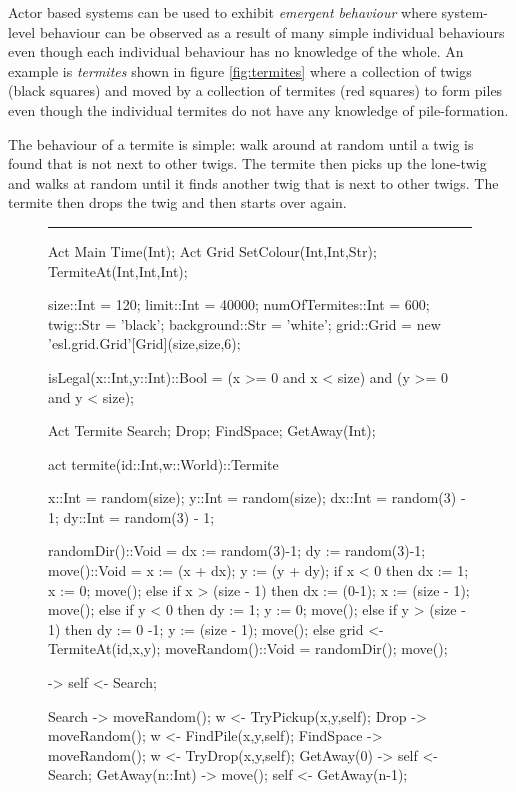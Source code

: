\documentclass[5p,times]{elsarticle}
\begin{document}
Actor based systems can be used to exhibit {\it emergent behaviour} where system-level behaviour can be observed as a result of many simple individual behaviours even though each individual behaviour has no knowledge of the whole. An example is {\it termites} shown in figure \ref{fig:termites} where a collection of twigs (black squares) and moved by a collection of termites (red squares) to form piles even though the individual termites do not have any knowledge of pile-formation.

The behaviour of a termite is simple: walk around at random until a twig is found that is not next to other twigs. The termite then picks up the lone-twig and walks at random until it finds another twig that is next to other twigs. The termite then drops the twig and then starts over again.


\begin{figure}
\hrule\textwidth1cm
\begin{multicols}{2}
\begin{FigESL}
Act Main { Time(Int); }
Act Grid { SetColour(Int,Int,Str); TermiteAt(Int,Int,Int);}

size::Int          = 120;
limit::Int         = 40000;
numOfTermites::Int = 600;
twig::Str          = 'black';
background::Str    = 'white';
grid::Grid         = new 'esl.grid.Grid'[Grid](size,size,6); 

isLegal(x::Int,y::Int)::Bool = 
  (x >= 0 and x < size) and (y >= 0 and y < size);

Act Termite {  Search; Drop; FindSpace; GetAway(Int); }

act termite(id::Int,w::World)::Termite { 

  x::Int  = random(size);
  y::Int  = random(size);
  dx::Int = random(3) - 1;
  dy::Int = random(3) - 1;
  
  randomDir()::Void = {
    dx := random(3)-1;
    dy := random(3)-1;
  }
  move()::Void = {
    x := (x + dx); y := (y + dy);
    if x < 0 
    then { dx := 1; x := 0; move();
    } else if x > (size - 1)
    then { dx := (0-1); x := (size - 1); move();
    } else if y < 0 
    then { dy := 1; y := 0; move();
    } else if y > (size - 1)
    then { dy := 0 -1; y := (size - 1); move();
    } else grid <- TermiteAt(id,x,y);
  }
  moveRandom()::Void = {
    randomDir();
    move();
  }
  
  -> self <- Search;
  
  Search -> {
    moveRandom();
    w <- TryPickup(x,y,self);
  }
  Drop -> {
    moveRandom();
    w <- FindPile(x,y,self);
  }
  FindSpace -> {
    moveRandom();
    w <- TryDrop(x,y,self);
  }
  GetAway(0) -> {
    self <- Search;
  }
  GetAway(n::Int) -> {
    move();
    self <- GetAway(n-1);
  }
}



\end{FigESL}
\end{multicols}
\end{figure}
\end{document}
